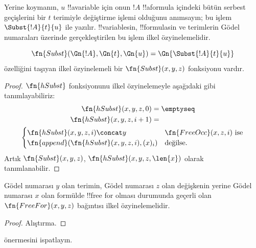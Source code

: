 


Yerine koymanın, $u$ !!a{variable} için onun $!A$ !!a{formula} içindeki bütün
serbest geçişlerini bir $t$ terimiyle değiştirme işlemi olduğunu anımsayın; bu işlem
$\Subst{!A}{t}{u}$ ile yazılır. !!{variable}s{}in, !!{formula}s{}in ve terimlerin
Gödel numaraları üzerinde gerçekleştirilen bu işlem ilkel özyinelemelidir.

\begin{prop}
\[
\fn{Subst}(\Gn{!A}, \Gn{t}, \Gn{u}) = \Gn{\Subst{!A}{t}{u}}
\]
özelliğini taşıyan ilkel özyinelemeli bir $\fn{Subst}(x,y,z)$ fonksiyonu
vardır.
\end{prop}

\begin{proof}
$\fn{hSubst}$ fonksiyonunu ilkel özyinelemeyle aşağıdaki gibi
tanımlayabiliriz:
\begin{multline*}
\begin{aligned}
\fn{hSubst}(x, y, z, 0) & = \emptyseq \\
\fn{hSubst}(x, y, z, i+1) & =
\end{aligned}\\
\begin{cases}
\fn{hSubst}(x, y, z, i) \concat y & \text{$\fn{FreeOcc}(x, z, i)$ ise} \\
\fn{append}(\fn{hSubst}(x, y, z, i), (x)_{i}) & \text{değilse.}
\end{cases}
\end{multline*}
Artık $\fn{Subst}(x,y,z)$, $\fn{hSubst}(x,y,z,\len{x})$ olarak
tanımlanabilir.
\end{proof}

\begin{prop}
Gödel numarası $y$ olan terimin, Gödel numarası $z$ olan değişkenin yerine
Gödel numarası $x$ olan formülde !!{free for} olması durumunda geçerli olan
$\fn{FreeFor}(x,y,z)$ bağıntısı ilkel özyinelemelidir.
\end{prop}

\begin{proof} Alıştırma. \end{proof}

\begin{prob}
 önermesini ispatlayın.
\end{prob}

